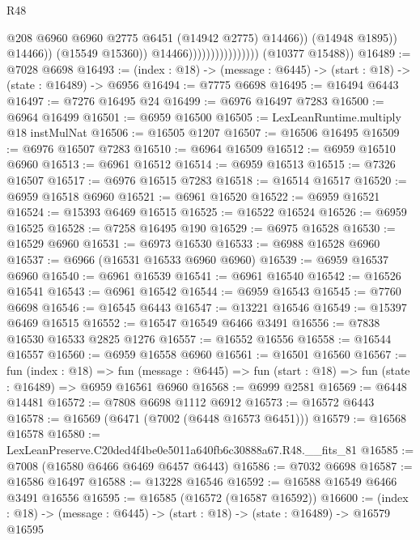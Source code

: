 \begin{lexlean}{R48}
\begin{coremodule}
                                                  @208
                                                  @6960
                                                  @6960
                                                  @2775
                                                  @6451
                                                  (@14942 @2775)
                                                  @14466))
                                              (@14948 @1895))
                                            @14466))
                                        (@15549 @15360))
                                      @14466))))))))))))))))
      (@10377 @15488))
@16489 := @7028 @6698
@16493 := (index : @18) -> (message : @6445) -> (start : @18) -> (state : @16489) -> @6956
@16494 := @7775 @6698
@16495 := @16494 @6443
@16497 := @7276 @16495 @24
@16499 := @6976 @16497 @7283
@16500 := @6964 @16499
@16501 := @6959 @16500
@16505 := LexLeanRuntime.multiply @18 instMulNat
@16506 := @16505 @1207
@16507 := @16506 @16495
@16509 := @6976 @16507 @7283
@16510 := @6964 @16509
@16512 := @6959 @16510 @6960
@16513 := @6961 @16512
@16514 := @6959 @16513
@16515 := @7326 @16507
@16517 := @6976 @16515 @7283
@16518 := @16514 @16517
@16520 := @6959 @16518 @6960
@16521 := @6961 @16520
@16522 := @6959 @16521
@16524 := @15393 @6469 @16515
@16525 := @16522 @16524
@16526 := @6959 @16525
@16528 := @7258 @16495 @190
@16529 := @6975 @16528
@16530 := @16529 @6960
@16531 := @6973 @16530
@16533 := @6988 @16528 @6960
@16537 := @6966 (@16531 @16533 @6960 @6960)
@16539 := @6959 @16537 @6960
@16540 := @6961 @16539
@16541 := @6961 @16540
@16542 := @16526 @16541
@16543 := @6961 @16542
@16544 := @6959 @16543
@16545 := @7760 @6698
@16546 := @16545 @6443
@16547 := @13221 @16546
@16549 := @15397 @6469 @16515
@16552 := @16547 @16549 @6466 @3491
@16556 := @7838 @16530 @16533 @2825 @1276
@16557 := @16552 @16556
@16558 := @16544 @16557
@16560 := @6959 @16558 @6960
@16561 := @16501 @16560
@16567 := fun (index : @18) =>
  fun (message : @6445) => fun (start : @18) => fun (state : @16489) => @6959 @16561 @6960
@16568 := @6999 @2581
@16569 := @6448 @14481
@16572 := @7808 @6698 @1112 @6912
@16573 := @16572 @6443
@16578 := @16569 (@6471 (@7002 (@6448 @16573 @6451)))
@16579 := @16568 @16578
@16580 := LexLeanPreserve.C20ded4f4be0e5011a640fb6c30888a67.R48.__fits_81
@16585 := @7008 (@16580 @6466 @6469 @6457 @6443)
@16586 := @7032 @6698
@16587 := @16586 @16497
@16588 := @13228 @16546
@16592 := @16588 @16549 @6466 @3491 @16556
@16595 := @16585 (@16572 (@16587 @16592))
@16600 := (index : @18) -> (message : @6445) -> (start : @18) -> (state : @16489) -> @16579 @16595

\end{coremodule}
\end{lexlean}
